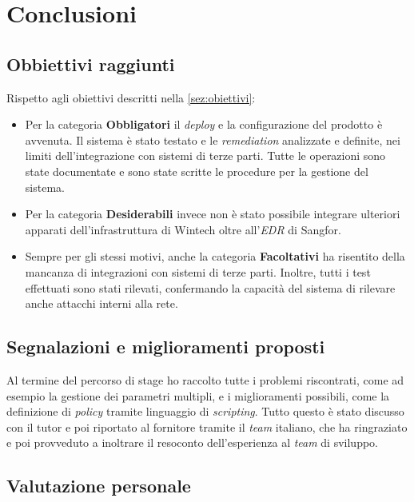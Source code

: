\chapter{Conclusioni}
\label{cap:conclusioni}

\section{Obbiettivi raggiunti}

Rispetto agli obiettivi descritti nella \autoref{sez:obiettivi}:

\begin{itemize}
    \item Per la categoria \textbf{Obbligatori} il \emph{deploy} e la configurazione del prodotto è avvenuta. Il sistema è stato testato e le \emph{remediation} analizzate e definite, nei limiti dell'integrazione con sistemi di terze parti. Tutte le operazioni sono state documentate e sono state scritte le procedure per la gestione del sistema.
    \item Per la categoria \textbf{Desiderabili} invece non è stato possibile integrare ulteriori apparati dell'infrastruttura di Wintech oltre all'\emph{EDR} di Sangfor.
    \item Sempre per gli stessi motivi, anche la categoria \textbf{Facoltativi} ha risentito della mancanza di integrazioni con sistemi di terze parti. Inoltre, tutti i test effettuati sono stati rilevati, confermando la capacità del sistema di rilevare anche attacchi interni alla rete.
\end{itemize}

\section{Segnalazioni e miglioramenti proposti}

Al termine del percorso di stage ho raccolto tutte i problemi riscontrati, come ad esempio la gestione dei parametri multipli, e i miglioramenti possibili, come la definizione di \emph{policy} tramite linguaggio di \emph{scripting}. Tutto questo è stato discusso con il tutor e poi riportato al fornitore tramite il \emph{team} italiano, che ha ringraziato e poi provveduto a inoltrare il resoconto dell'esperienza al \emph{team} di sviluppo.

\section{Valutazione personale}


